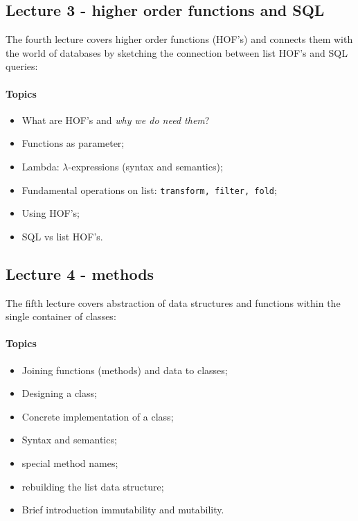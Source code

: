 			\subsection{Lecture 3 - higher order functions and SQL}
				The fourth lecture covers higher order functions (HOF's) and connects them with the world of databases by sketching the connection between list HOF's and SQL queries:

				\paragraph*{Topics}
					\begin{itemize}
						\item What are HOF's and \textit{why we do need them}?
						\item Functions as parameter;
						\item Lambda: $\lambda$-expressions (syntax and semantics);
						\item Fundamental operations on list: \texttt{transform, filter, fold};
						\item Using HOF's;
						\item SQL vs list HOF's.
					\end{itemize}

			\subsection{Lecture 4 - methods}
				The fifth lecture covers abstraction of data structures and functions within the single container of classes:

				\paragraph*{Topics}
					\begin{itemize}
						\item Joining functions (methods) and data to classes;
						\item Designing a class;
						\item Concrete implementation of a class;
						\item Syntax and semantics;
						\item special method names;
						\item rebuilding the list data structure;
						\item Brief introduction immutability and mutability.
					\end{itemize}

